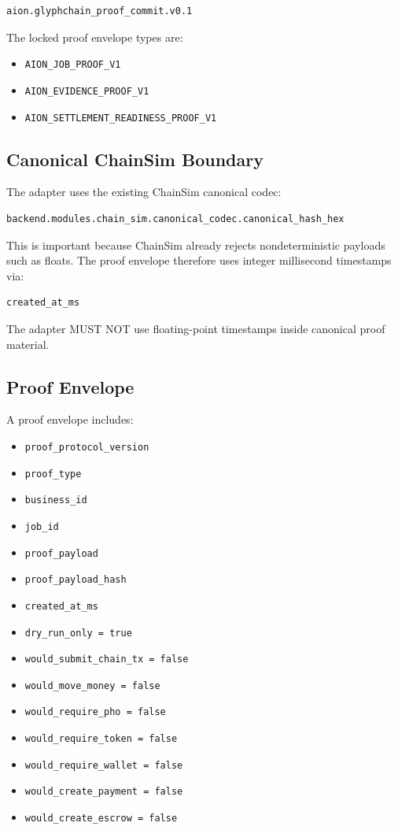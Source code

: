 \begin{verbatim}
aion.glyphchain_proof_commit.v0.1
\end{verbatim}

The locked proof envelope types are:

\begin{itemize}
  \item \texttt{AION\_JOB\_PROOF\_V1}
  \item \texttt{AION\_EVIDENCE\_PROOF\_V1}
  \item \texttt{AION\_SETTLEMENT\_READINESS\_PROOF\_V1}
\end{itemize}

\subsection{Canonical ChainSim Boundary}

The adapter uses the existing ChainSim canonical codec:

\begin{verbatim}
backend.modules.chain_sim.canonical_codec.canonical_hash_hex
\end{verbatim}

This is important because ChainSim already rejects nondeterministic payloads such as floats. The proof envelope therefore uses integer millisecond timestamps via:

\begin{verbatim}
created_at_ms
\end{verbatim}

The adapter MUST NOT use floating-point timestamps inside canonical proof material.

\subsection{Proof Envelope}

A proof envelope includes:

\begin{itemize}
  \item \texttt{proof\_protocol\_version}
  \item \texttt{proof\_type}
  \item \texttt{business\_id}
  \item \texttt{job\_id}
  \item \texttt{proof\_payload}
  \item \texttt{proof\_payload\_hash}
  \item \texttt{created\_at\_ms}
  \item \texttt{dry\_run\_only = true}
  \item \texttt{would\_submit\_chain\_tx = false}
  \item \texttt{would\_move\_money = false}
  \item \texttt{would\_require\_pho = false}
  \item \texttt{would\_require\_token = false}
  \item \texttt{would\_require\_wallet = false}
  \item \texttt{would\_create\_payment = false}
  \item \texttt{would\_create\_escrow = false}
\end{itemize}

